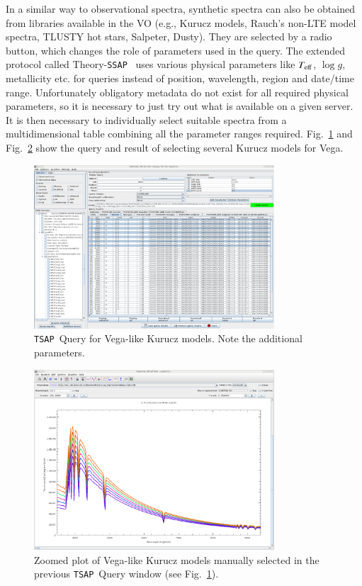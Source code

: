 \documentclass[final,authoryear,5p,times,twocolumn]{elsarticle}
\newcommand{\ssap}{\texttt{SSAP}}
\newcommand{\tsap}{\texttt{TSAP}}
\begin{document}
In a similar way to observational spectra, synthetic spectra can also be
obtained from libraries available in the VO (e.g., Kurucz models, Rauch's
non-LTE model spectra, TLUSTY hot stars, Salpeter, Dusty). They are selected by
a radio button, which changes the role of parameters used in the query. The
extended protocol called Theory-\ssap\ \citep[hereafter TSAP;][]{ssap} uses
various physical parameters like $T_{\rm eff}$, $\log g$, metallicity etc. for
queries instead of position, wavelength, region and date/time range.
Unfortunately obligatory metadata do not exist for all required physical
parameters, so it is necessary to just try out what is available on a given
server.  It is then necessary to individually select suitable spectra from a
multidimensional table combining all the parameter ranges required.
Fig.~\ref{fig:TSAP-query} and Fig.~\ref{fig:TSAP-plot} show the query and
result of selecting several Kurucz models for Vega.


\begin{figure}[t]
\begin{center}
\includegraphics[width=0.8\textwidth]{TSSA-query.pdf}
\caption{\tsap\ Query for Vega-like Kurucz models. Note the additional
parameters.}
\label{fig:TSAP-query}
\end{center}
\end{figure}


\begin{figure}[t]
\begin{center}
\includegraphics[width=0.8\textwidth]{TSSA-plot.pdf} \caption{Zoomed plot of
Vega-like Kurucz models manually selected in the previous
\tsap\ Query window (see Fig.~\ref{fig:TSAP-query}). }
\label{fig:TSAP-plot}
\end{center}
\end{figure}
\end{document}
